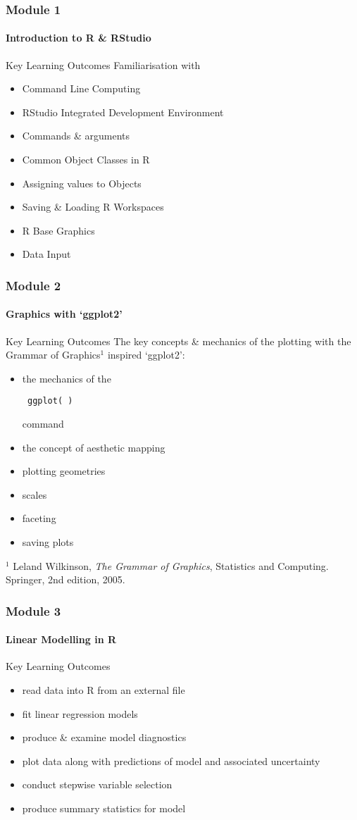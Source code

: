 \documentclass[xcolor=dvipsnames]{beamer}
\begin{document}
\begin{frame}
\frametitle{Module 1}
\framesubtitle{Introduction to R \& RStudio}
\begin{block}{Key Learning Outcomes}
Familiarisation with \begin{itemize}
\item Command Line Computing
\item RStudio Integrated Development Environment
\item Commands \& arguments
\item Common Object Classes in R
\item Assigning values to Objects
\item Saving \& Loading R Workspaces
\item R Base Graphics
\item Data Input
\end{itemize}
\end{block}
\end{frame}

\begin{frame}[fragile]
\frametitle{Module 2}
\framesubtitle{Graphics with `ggplot2'}
\begin{block}{Key Learning Outcomes}
The key concepts \& mechanics of the plotting with the Grammar of Graphics$^1$ inspired `ggplot2': \begin{itemize}
\item the mechanics of the \begin{verbatim} ggplot( ) \end{verbatim} command
\item the concept of aesthetic mapping
\item plotting geometries
\item scales
\item faceting
\item saving plots
\end{itemize}
\end{block}

\tiny $^1$ Leland Wilkinson, \textit{The Grammar of Graphics}, Statistics and Computing. Springer, 2nd edition, 2005.
\end{frame}

\begin{frame}
\frametitle{Module 3}
\framesubtitle{Linear Modelling in R}
\begin{block}{Key Learning Outcomes}
\begin{itemize}
\item read data into R from an external file
\item fit linear regression models
\item produce \& examine model diagnostics
\item plot data along with predictions of model and associated uncertainty
\item conduct stepwise variable selection
\item produce summary statistics for model
\end{itemize}
\end{block}
\end{frame}
\end{document}
